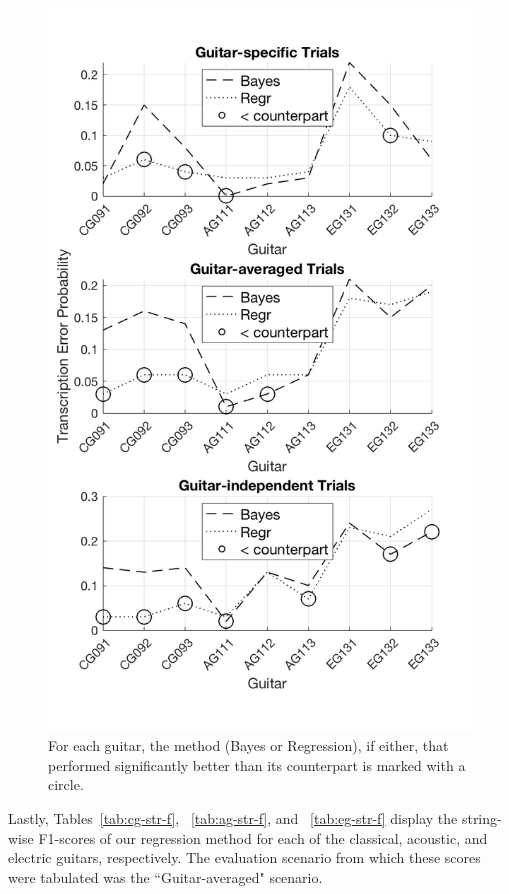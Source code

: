 \documentclass[convention,peer-reviewed]{aesconf}
\begin{document}
\begin{figure}[!t]
\centering
\includegraphics[scale=0.275]{novel-methods-sig-comp}
\caption{For each guitar, the method (Bayes or Regression), if either, that performed significantly better than its counterpart is marked with a circle.}
\label{fig:novel-methods-sig-comp}
\end{figure}

Lastly, Tables~\ref{tab:cg-str-f}, ~\ref{tab:ag-str-f}, and ~\ref{tab:eg-str-f} display the string-wise F1-scores of our regression method for each of the classical, acoustic, and electric guitars, respectively. The evaluation scenario from which these scores were tabulated was the ``Guitar-averaged" scenario. 
\end{document}
